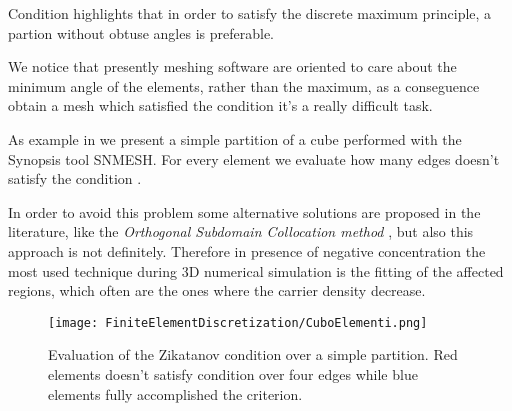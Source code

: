 \begin{Osservazione}
Condition  highlights that in order to satisfy the discrete maximum principle, a partion without obtuse angles is preferable.
\end{Osservazione}

We notice that presently meshing software are oriented to care about the minimum angle of the elements, rather than the maximum, as a conseguence obtain a mesh which satisfied the condition  it's a really difficult task. 

As example in  we present a simple partition of a cube performed with the Synopsis tool SNMESH. For every element we evaluate how many edges doesn't satisfy the condition .

In order to avoid this problem some alternative solutions are proposed in the literature, like the \textit{Orthogonal Subdomain Collocation method} \cite{OSCputticorded}, but also this approach is not definitely. 
Therefore in presence of negative concentration the most used technique during 3D numerical simulation is the fitting of the affected regions, which often are the ones where the carrier density decrease.

\vspace{1cm}

\begin{figure}[!h]
\centering
\texttt{[image: FiniteElementDiscretization/CuboElementi.png]}
\caption{Evaluation of the Zikatanov condition over a simple partition. Red elements doesn't satisfy condition   over four edges while blue elements fully accomplished the criterion.}
\label{fig: cubo zikatanov}
\end{figure}


